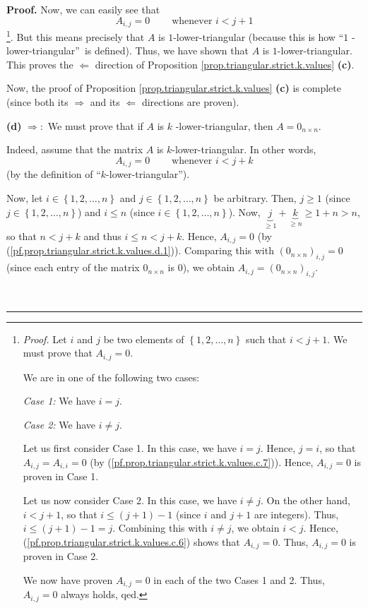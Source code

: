 \documentclass[numbers=enddot,12pt,final,onecolumn,notitlepage]{scrartcl}%
\theoremstyle{definition}
\newenvironment{proof}[1][Proof]{\noindent\textbf{#1.} }{\ \rule{0.5em}{0.5em}}
\begin{document}
\begin{proof}
Now, we can easily see that%
\[
A_{i,j}=0\ \ \ \ \ \ \ \ \ \ \text{whenever }i<j+1
\]
\footnote{\textit{Proof.} Let $i$ and $j$ be two elements of $\left\{
1,2,\ldots,n\right\}  $ such that $i<j+1$. We must prove that $A_{i,j}=0$.
\par
We are in one of the following two cases:
\par
\textit{Case 1:} We have $i=j$.
\par
\textit{Case 2:} We have $i\neq j$.
\par
Let us first consider Case 1. In this case, we have $i=j$. Hence, $j=i$, so
that $A_{i,j}=A_{i,i}=0$ (by (\ref{pf.prop.triangular.strict.k.values.c.7})).
Hence, $A_{i,j}=0$ is proven in Case 1.
\par
Let us now consider Case 2. In this case, we have $i\neq j$. On the other
hand, $i<j+1$, so that $i\leq\left(  j+1\right)  -1$ (since $i$ and $j+1$ are
integers). Thus, $i\leq\left(  j+1\right)  -1=j$. Combining this with $i\neq
j$, we obtain $i<j$. Hence, (\ref{pf.prop.triangular.strict.k.values.c.6})
shows that $A_{i,j}=0$. Thus, $A_{i,j}=0$ is proven in Case 2.
\par
We now have proven $A_{i,j}=0$ in each of the two Cases 1 and 2. Thus,
$A_{i,j}=0$ always holds, qed.}. But this means precisely that $A$ is
$1$-lower-triangular (because this is how \textquotedblleft$1$%
-lower-triangular\textquotedblright\ is defined). Thus, we have shown that $A$
is $1$-lower-triangular. This proves the $\Longleftarrow$ direction of
Proposition \ref{prop.triangular.strict.k.values} \textbf{(c)}.

Now, the proof of Proposition \ref{prop.triangular.strict.k.values}
\textbf{(c)} is complete (since both its $\Longrightarrow$ and its
$\Longleftarrow$ directions are proven).

\textbf{(d)} $\Longrightarrow:$ We must prove that if $A$ is $k$%
-lower-triangular, then $A=0_{n\times n}$.

Indeed, assume that the matrix $A$ is $k$-lower-triangular. In other words,%
\begin{equation}
A_{i,j}=0\ \ \ \ \ \ \ \ \ \ \text{whenever }i<j+k
\label{pf.prop.triangular.strict.k.values.d.1}%
\end{equation}
(by the definition of \textquotedblleft$k$-lower-triangular\textquotedblright).

Now, let $i\in\left\{  1,2,\ldots,n\right\}  $ and $j\in\left\{
1,2,\ldots,n\right\}  $ be arbitrary. Then, $j\geq1$ (since $j\in\left\{
1,2,\ldots,n\right\}  $) and $i\leq n$ (since $i\in\left\{  1,2,\ldots
,n\right\}  $). Now, $\underbrace{j}_{\geq1}+\underbrace{k}_{\geq n}\geq
1+n>n$, so that $n<j+k$ and thus $i\leq n<j+k$. Hence, $A_{i,j}=0$ (by
(\ref{pf.prop.triangular.strict.k.values.d.1})). Comparing this with $\left(
0_{n\times n}\right)  _{i,j}=0$ (since each entry of the matrix $0_{n\times
n}$ is $0$), we obtain $A_{i,j}=\left(  0_{n\times n}\right)  _{i,j}$.


\end{proof}
\end{document}
